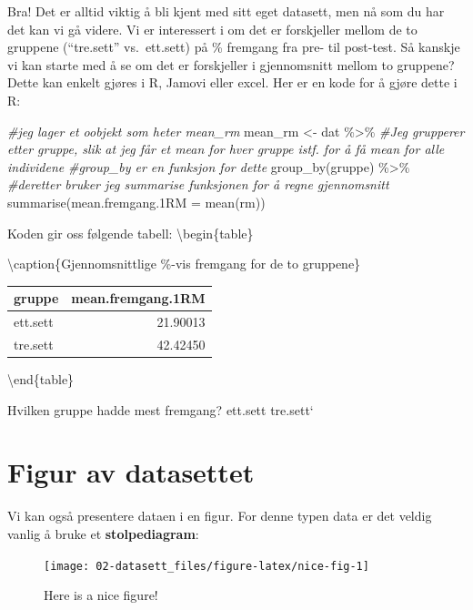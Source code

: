 \documentclass[
]{book}
\newenvironment{Shaded}{\begin{snugshade}}{\end{snugshade}}
\newcommand{\AttributeTok}[1]{\textcolor[rgb]{0.77,0.63,0.00}{#1}}
\newcommand{\CommentTok}[1]{\textcolor[rgb]{0.56,0.35,0.01}{\textit{#1}}}
\newcommand{\FunctionTok}[1]{\textcolor[rgb]{0.00,0.00,0.00}{#1}}
\newcommand{\NormalTok}[1]{#1}
\newcommand{\OtherTok}[1]{\textcolor[rgb]{0.56,0.35,0.01}{#1}}
\newcommand{\SpecialCharTok}[1]{\textcolor[rgb]{0.00,0.00,0.00}{#1}}
\begin{document}
Bra! Det er alltid viktig å bli kjent med sitt eget datasett, men nå som du har det kan vi gå videre. Vi er interessert i om det er forskjeller mellom de to gruppene (``tre.sett'' vs.~ett.sett) på \% fremgang fra pre- til post-test. Så kanskje vi kan starte med å se om det er forskjeller i gjennomsnitt mellom to gruppene? Dette kan enkelt gjøres i R, Jamovi eller excel. Her er en kode for å gjøre dette i R:

\begin{Shaded}
\begin{Highlighting}[]
\CommentTok{\#jeg lager et oobjekt som heter mean\_rm }
\NormalTok{mean\_rm }\OtherTok{\textless{}{-}}\NormalTok{ dat }\SpecialCharTok{\%\textgreater{}\%}
  \CommentTok{\#Jeg grupperer etter gruppe, slik at jeg får et mean for hver gruppe istf. for å få mean for alle individene}
  \CommentTok{\#group\_by er en funksjon for dette}
  \FunctionTok{group\_by}\NormalTok{(gruppe) }\SpecialCharTok{\%\textgreater{}\%}
  \CommentTok{\#deretter bruker jeg summarise funksjonen for å regne gjennomsnitt}
  \FunctionTok{summarise}\NormalTok{(}\AttributeTok{mean.fremgang.1RM =} \FunctionTok{mean}\NormalTok{(rm))}
\end{Highlighting}
\end{Shaded}

Koden gir oss følgende tabell:
\textbackslash begin\{table\}

\textbackslash caption\{\label{tab:unnamed-chunk-6}Gjennomsnittlige \%-vis fremgang for de to gruppene\}
\centering

\begin{tabular}[t]{lr}
\toprule
gruppe & mean.fremgang.1RM\\
\midrule
ett.sett & 21.90013\\
tre.sett & 42.42450\\
\bottomrule
\end{tabular}

\textbackslash end\{table\}

Hvilken gruppe hadde mest fremgang?
ett.sett tre.sett`

\hypertarget{figur-av-datasettet}{%
\section{Figur av datasettet}\label{figur-av-datasettet}}

Vi kan også presentere dataen i en figur. For denne typen data er det veldig vanlig å bruke et \textbf{stolpediagram}:

\begin{figure}

{\centering \texttt{[image: 02-datasett\_files/figure-latex/nice-fig-1]} 

}

\caption{Here is a nice figure!}\label{fig:nice-fig}
\end{figure}
\end{document}
